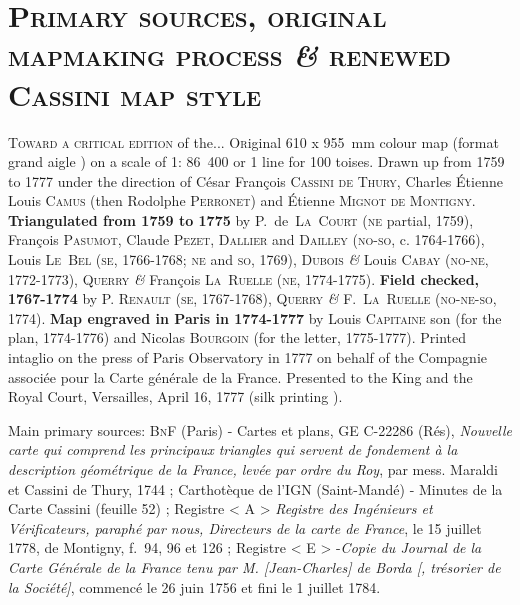 \documentclass[portrait,a0]{sciposter}
\begin{document}
\vspace{-1cm}
\begin{minipage}[b]{\textwidth}
  \section{\normalfont \textsc{Primary sources, original mapmaking process \textit{\&} renewed Cassini map style}}
  \begin{multicols}{3}
    \setlength{\columnsep}{80pt}
\textsc{Toward a critical edition} \small{of the...}
\vfill
\normalsize
\lettrine{O}riginal 610 x 955~mm colour map (format \og grand aigle \fg) on a scale of 1: 86~400 or 1 line for 100 toises. Drawn up from 1759 to 1777 under the direction of César François \textsc{Cassini de Thury}, Charles Étienne Louis \textsc{Camus} (then Rodolphe \textsc{Perronet}) and Étienne \textsc{Mignot de Montigny}. \textbf{Triangulated from 1759 to 1775} by P.~de~\textsc{La~Court} (\textsc{ne} partial, 1759), François \textsc{Pasumot}, Claude \textsc{Pezet}, \textsc{Dallier} and \textsc{Dailley} (\textsc{no-so}, c. 1764-1766), Louis \textsc{Le~Bel} (\textsc{se}, 1766-1768; \textsc{ne} and \textsc{so}, 1769), \textsc{Dubois} \textit{\&} Louis \textsc{Cabay} (\textsc{no-ne}, 1772-1773), Q\textsc{uerry} \textit{\&} François \textsc{La~Ruelle} (\textsc{ne}, 1774-1775). \textbf{Field checked, 1767-1774} by P. \textsc{Renault} (\textsc{se}, 1767-1768), Q\textsc{uerry} \textit{\&} F.~\textsc{La~Ruelle} (\textsc{no-ne-so}, 1774). \textbf{Map engraved in Paris in 1774-1777} by Louis \textsc{Capitaine} son (for the plan, 1774-1776) and Nicolas \textsc{Bourgoin} (for the letter, 1775-1777). Printed intaglio on the press of Paris Observatory in 1777 on behalf of the Compagnie associée pour la Carte générale de la France. Presented to the King and the Royal Court, Versailles, April 16, 1777 (\og silk printing \fg).\\
\vfill


\scriptsize Main primary sources: \textsc{BnF} (Paris) - Cartes et plans, GE C-22286 (Rés), \textit{Nouvelle carte qui comprend les principaux triangles qui servent de fondement à la description géométrique de la France, levée par ordre du Roy}, par mess. Maraldi et Cassini de Thury, 1744 ; Carthotèque de l'IGN (Saint-Mandé) - Minutes de la Carte Cassini (feuille 52) ; Registre < A > \textit{Registre des Ingénieurs et Vérificateurs, paraphé par nous, Directeurs de la carte de France}, le 15 juillet 1778, de Montigny, f.~94, 96 et 126 ; Registre  < E > -\textit{Copie du Journal de la Carte Générale de la France tenu par M. [Jean-Charles] de Borda [, trésorier de la Société]}, commencé le 26 juin 1756 et fini le 1 juillet 1784.


\end{multicols}
\end{minipage}
\end{document}
